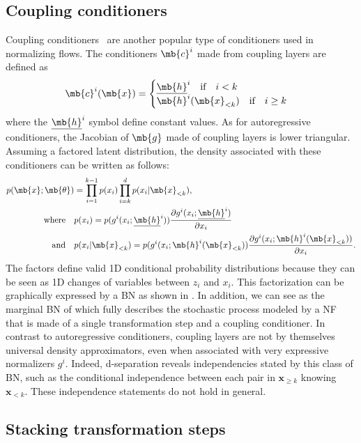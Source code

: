 \subsection{Coupling conditioners}
Coupling conditioners~\cite{RealNVP} are another popular type of conditioners used in normalizing flows. The conditioners $\mb{c}^i$ made from coupling layers are defined as
\begin{align*}
    \mb{c}^i(\mb{x}) =
    \begin{cases}
    \underline{\mb{h}}^i \quad \text{if} \quad i < k\\
    \mb{h}^i(\mb{x}_{<k}) \quad \text{if} \quad i \geq k\\
    \end{cases}
\end{align*}
where the $\underline{\mb{h}}^i$ symbol define constant values. As for autoregressive conditioners, the Jacobian of $\mb{g}$ made of coupling layers is lower triangular. Assuming a factored latent distribution, the density associated with these conditioners can be written as follows:
\begin{align*}
    p(\mb{x}; \mb{\theta}) &= \prod^{k-1}_{i=1} p(x_i)\prod^{d}_{i=k} p(x_i|\mb{x}_{< k}),\\
    \text{where} \quad & p(x_i) = p(g^i(x_i; \underline{\mb{h}}^i))\frac{\partial g^i(x_i; \underline{\mb{h}}^i)}{\partial x_i} \\ \text{and} \quad & p(x_i|\mb{x}_{< k}) = p(g^i(x_i; \mb{h}^i(\mb{x}_{<k})) \frac{\partial g^i(x_i; \mb{h}^i(\mb{x}_{<k}))}{\partial x_i}.
\end{align*}
The factors define valid 1D conditional probability distributions because they can be seen as 1D changes of variables between $z_i$ and $x_i$. This factorization can be graphically expressed by a BN as shown in . In addition, we can see  as the marginal BN of  which fully describes the stochastic process modeled by a NF that is made of a single transformation step and a coupling conditioner.
In contrast to autoregressive conditioners, coupling layers are not by themselves universal density approximators, even when associated with very expressive normalizers $g^i$.
Indeed, d-separation reveals independencies stated by this class of BN, such as the conditional independence between each pair in $\mathbf{x}_{\geq k}$ knowing $\mathbf{x}_{< k}$. These independence statements do not hold in general.


\subsection{Stacking transformation steps} \label{sec:multiple-step-flow-as-BN}


